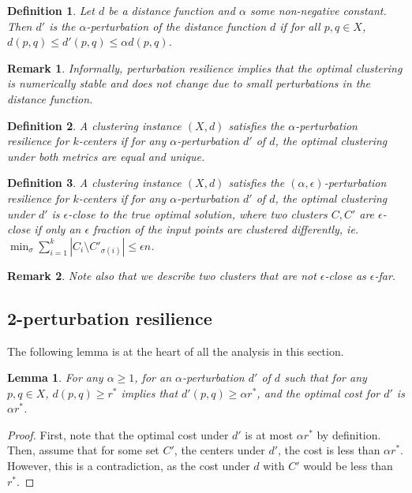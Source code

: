 \documentclass{article}
\newtheorem{definition}{Definition}
\newtheorem{remark}{Remark}
\newtheorem{lemma}{Lemma}
\begin{document}
\begin{definition}
Let $d$ be a distance function and $\alpha$ some non-negative constant. Then $d'$ is the \emph{$\alpha$-perturbation} of the distance function $d$ if for all $p,q\in X$, $d(p,q)\leq d'(p,q)\leq\alpha d(p,q)$.
\end{definition}

\begin{remark}
Informally, perturbation resilience implies that the optimal clustering is numerically stable and does not change due to small perturbations in the distance function.
\end{remark}

\begin{definition}
A clustering instance $(X,d)$ satisfies the \emph{$\alpha$-perturbation resilience} for $k$-centers if for any $\alpha$-perturbation $d'$ of $d$, the optimal clustering under both metrics are equal and unique.
\end{definition}

\begin{definition}
A clustering instance $(X,d)$ satisfies the $(\alpha,\epsilon)$-perturbation resilience for $k$-centers if for any $\alpha$-perturbation $d'$ of $d$, the optimal clustering under $d'$ is $\epsilon$-close to the true optimal solution, where two clusters $C,C'$ are $\epsilon$-close if only an $\epsilon$ fraction of the input points are clustered differently, ie. $\min_\sigma\sum_{i=1}^k|C_i\setminus C'_{\sigma(i)}|\leq\epsilon n$.
\end{definition}

\begin{remark}
Note also that we describe two clusters that are not $\epsilon$-close as $\epsilon$-far.
\end{remark}

\subsection{2-perturbation resilience}

The following lemma is at the heart of all the analysis in this section.

\begin{lemma}
For any $\alpha\geq1$, for an $\alpha$-perturbation $d'$ of $d$ such that for any $p,q\in X$, $d(p,q)\geq r^*$ implies that $d'(p,q)\geq\alpha r^*$, and the optimal cost for $d'$ is $\alpha r^*$.
\end{lemma}

\begin{proof}
First, note that the optimal cost under $d'$ is at most $\alpha r^*$ by definition. Then, assume that for some set $C'$, the centers under $d'$, the cost is less than $\alpha r^*$. However, this is a contradiction, as the cost under $d$ with $C'$ would be less than $r^*$.
\end{proof}
\end{document}
